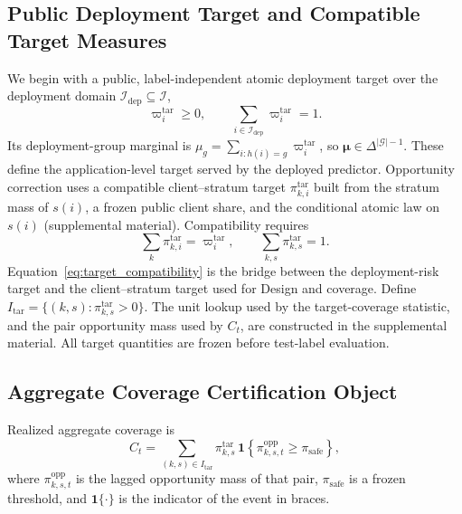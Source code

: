 \documentclass[letterpaper,journal]{IEEEtran}
\begin{document}
\subsection{Public Deployment Target and Compatible Target Measures}
\label{subsec:target_measures}

We begin with a public, label-independent atomic deployment target over the
deployment domain $\mathcal{I}_{\mathrm{dep}}\subseteq\mathcal{I}$,
\begin{equation}
    \varpi_i^{\mathrm{tar}}\ge0,
    \qquad
    \sum_{i\in\mathcal{I}_{\mathrm{dep}}}
    \varpi_i^{\mathrm{tar}}=1.
    \label{eq:atomic_target}
\end{equation}
Its deployment-group marginal is
$\mu_g=\sum_{i:h(i)=g}\varpi_i^{\mathrm{tar}}$, so
$\boldsymbol{\mu}\in\Delta^{|\mathcal{G}|-1}$.
These define the application-level target served by the deployed
predictor.  Opportunity correction uses a compatible client--stratum target
$\pi^{\mathrm{tar}}_{k,i}$ built from the stratum mass of $s(i)$, a frozen
public client share, and the conditional atomic law on $s(i)$
(supplemental material).  Compatibility requires
\begin{equation}
    \sum_k\pi^{\mathrm{tar}}_{k,i}
    =
    \varpi_i^{\mathrm{tar}},
    \qquad
    \sum_{k,s}\pi^{\mathrm{tar}}_{k,s}=1.
    \label{eq:target_compatibility}
\end{equation}
Equation~\eqref{eq:target_compatibility} is the bridge between the
deployment-risk target and the client--stratum target used for Design
and coverage.  Define $I_{\mathrm{tar}}=\{(k,s):\pi^{\mathrm{tar}}_{k,s}>0\}$.
The unit lookup used by the target-coverage statistic, and the pair opportunity
mass used by $C_t$, are constructed in the supplemental material.
All target quantities are frozen before test-label evaluation.

\subsection{Aggregate Coverage Certification Object}
\label{subsec:agg_coverage_object}

Realized aggregate coverage is
\begin{equation}
 C_t
 =
 \sum_{(k,s)\in I_{\mathrm{tar}}}
 \pi^{\mathrm{tar}}_{k,s}
 \,
 \mathbf{1}\!\left\{\pi^{\mathrm{opp}}_{k,s,t}\ge\pi_{\mathrm{safe}}\right\},
 \label{eq:agg_Ct}
\end{equation}
where $\pi^{\mathrm{opp}}_{k,s,t}$ is the lagged opportunity mass of
that pair, $\pi_{\mathrm{safe}}$ is a frozen threshold, and
$\mathbf{1}\{\cdot\}$ is the indicator of the event in braces.
\end{document}

